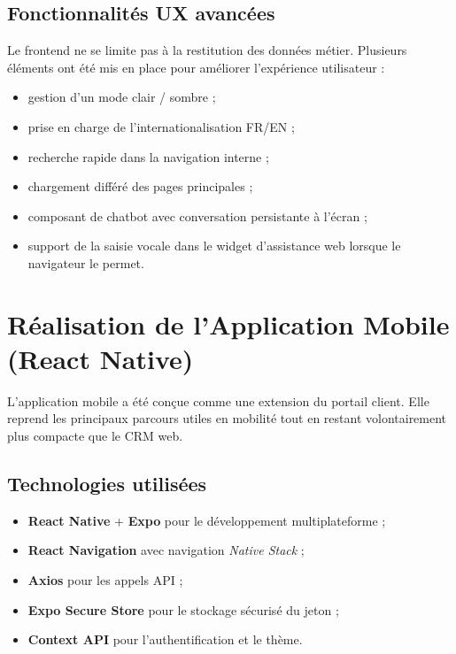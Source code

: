 
\subsection{Fonctionnalités UX avancées}
Le frontend ne se limite pas à la restitution des données métier. Plusieurs éléments ont été mis en place pour améliorer l'expérience utilisateur :
\begin{itemize}
    \item gestion d'un mode clair / sombre ;
    \item prise en charge de l'internationalisation FR/EN ;
    \item recherche rapide dans la navigation interne ;
    \item chargement différé des pages principales ;
    \item composant de chatbot avec conversation persistante à l'écran ;
    \item support de la saisie vocale dans le widget d'assistance web lorsque le navigateur le permet.
\end{itemize}

\section{Réalisation de l'Application Mobile (React Native)}
L'application mobile a été conçue comme une extension du portail client. Elle reprend les principaux parcours utiles en mobilité tout en restant volontairement plus compacte que le CRM web.

\subsection{Technologies utilisées}
\begin{itemize}
    \item \textbf{React Native} + \textbf{Expo} pour le développement multiplateforme ;
    \item \textbf{React Navigation} avec navigation \textit{Native Stack} ;
    \item \textbf{Axios} pour les appels API ;
    \item \textbf{Expo Secure Store} pour le stockage sécurisé du jeton ;
    \item \textbf{Context API} pour l'authentification et le thème.
\end{itemize}

